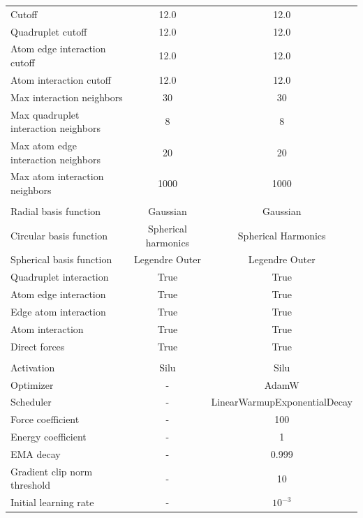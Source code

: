 \documentclass{article}
\begin{document}
\begin{table}[H]
\begin{tabular}{lcc}
Cutoff & 12.0 & 12.0\\
Quadruplet cutoff & 12.0 &  12.0\\
Atom edge interaction cutoff &  12.0 & 12.0 \\
Atom interaction cutoff & 12.0 & 12.0 \\
Max interaction neighbors & 30 & 30\\
Max quadruplet interaction neighbors & 8 & 8 \\
Max atom edge interaction neighbors & 20 & 20\\
Max atom interaction neighbors & 1000 & 1000\\\\

Radial basis function & Gaussian & Gaussian\\
Circular basis function & Spherical harmonics & Spherical Harmonics\\
Spherical basis function & Legendre Outer & Legendre Outer\\
Quadruplet interaction & True & True\\
Atom edge interaction & True & True\\
Edge atom interaction & True & True\\
Atom interaction & True & True \\
Direct forces & True & True \\\\

Activation & Silu & Silu \\
Optimizer & - & AdamW\\
Scheduler & - & LinearWarmupExponentialDecay \\
Force coefficient & - & 100 \\
Energy coefficient & - & 1 \\
EMA decay & - & 0.999\\
Gradient clip norm threshold & - & 10\\
Initial learning rate & - & $10^{-3}$\\
\end{tabular}
\end{table}
\end{document}
